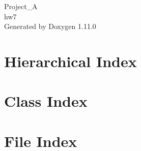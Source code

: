 \documentclass[twoside]{book}
\newcommand{\+}{\discretionary{\mbox{\scriptsize$\hookleftarrow$}}{}{}}
\newcommand{\clearemptydoublepage}{%
    \newpage{\pagestyle{empty}\cleardoublepage}%
  }
\begin{document}
  \raggedbottom
    \hypersetup{pageanchor=false,
                bookmarksnumbered=true,
                pdfencoding=unicode
               }
  \begin{titlepage}
  \vspace*{7cm}
  \begin{center}%
  {\Large Project\+\_\+A}\\
  [1ex]\large hw7 \\
  \vspace*{1cm}
  {\large Generated by Doxygen 1.11.0}\\
  \end{center}
  \end{titlepage}
  \clearemptydoublepage
  \tableofcontents
  \clearemptydoublepage
  \hypersetup{pageanchor=true}

\chapter{Hierarchical Index}

\chapter{Class Index}

\chapter{File Index}

\end{document}
